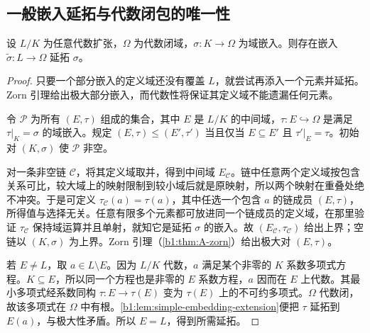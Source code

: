 \subsection{一般嵌入延拓与代数闭包的唯一性}
\label{b1:subsec:1502:02}

\begin{theorem}[嵌入延拓]\label{b1:thm:embedding-extension}
	设 \(L/K\) 为任意代数扩张，\(\Omega\) 为代数闭域，\(\sigma:K\rightarrow\Omega\) 为域嵌入。则存在嵌入 \(\widetilde\sigma:L\rightarrow\Omega\) 延拓 \(\sigma\)。
\end{theorem}
\begin{proof}
	只要一个部分嵌入的定义域还没有覆盖 \(L\)，就尝试再添入一个元素并延拓。Zorn 引理给出极大部分嵌入，而代数性将保证其定义域不能遗漏任何元素。

	令 \(\mathcal P\) 为所有 \((E,\tau)\) 组成的集合，其中 \(E\) 是 \(L/K\) 的中间域，\(\tau:E\hookrightarrow\Omega\) 是满足 \(\tau|_K=\sigma\) 的域嵌入。规定 \((E,\tau)\le(E',\tau')\) 当且仅当 \(E\subseteq E'\) 且 \(\tau'|_E=\tau\)。初始对 \((K,\sigma)\) 使 \(\mathcal P\) 非空。

	对一条非空链 \(\mathcal C\)，将其定义域取并，得到中间域 \(E_{\mathcal C}\)。链中任意两个定义域按包含关系可比，较大域上的映射限制到较小域后就是原映射，所以两个映射在重叠处绝不冲突。于是可定义 \(\tau_{\mathcal C}(a)=\tau(a)\)，其中任选一个包含 \(a\) 的链成员 \((E,\tau)\)，所得值与选择无关。任意有限多个元素都可放进同一个链成员的定义域，在那里验证 \(\tau_{\mathcal C}\) 保持域运算并且单射，就知它是延拓 \(\sigma\) 的嵌入。故 \((E_{\mathcal C},\tau_{\mathcal C})\) 给出上界；空链以 \((K,\sigma)\) 为上界。Zorn 引理（\cref{b1:thm:A-zorn}）给出极大对 \((E,\tau)\)。

	若 \(E\neq L\)，取 \(a\in L\setminus E\)。因为 \(L/K\) 代数，\(a\) 满足某个非零的 \(K\) 系数多项式方程。\(K\subseteq E\)，所以同一个方程也是非零的 \(E\) 系数方程，\(a\) 因而在 \(E\) 上代数。其最小多项式经系数同构 \(\tau:E\rightarrow\tau(E)\) 变为 \(\tau(E)\) 上的不可约多项式。\(\Omega\) 代数闭，故该多项式在 \(\Omega\) 中有根。\cref{b1:lem:simple-embedding-extension}便把 \(\tau\) 延拓到 \(E(a)\)，与极大性矛盾。所以 \(E=L\)，得到所需延拓。
\end{proof}

